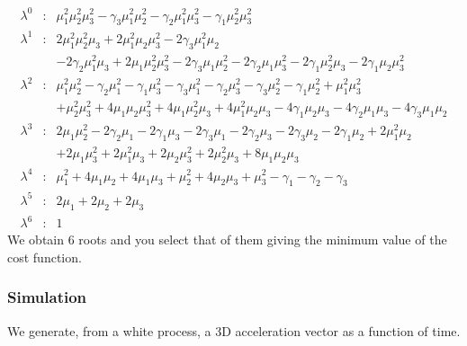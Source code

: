 \documentclass[a4paper, 12pt]{report}
\begin{document}
\begin{eqnarray*}
\lambda^{0}&:&
\mu_{1}^2\mu_{2}^2\mu_{3}^2 - \gamma_{3}\mu_{1}^2\mu_{2}^2 - \gamma_{2}\mu_{1}^2\mu_{3}^2 - \gamma_{1}\mu_{2}^2\mu_{3}^2
\\
\lambda^{1}&:&
2\mu_{1}^2\mu_{2}^2\mu_{3} + 2\mu_{1}^2\mu_{2}\mu_{3}^2 - 2\gamma_{3}\mu_{1}^2\mu_{2} \\
&&- 2\gamma_{2}\mu_{1}^2\mu_{3} + 2\mu_{1}\mu_{2}^2\mu_{3}^2 - 2\gamma_{3}\mu_{1}\mu_{2}^2 - 2\gamma_{2}\mu_{1}\mu_{3}^2 - 2\gamma_{1}\mu_{2}^2\mu_{3} - 2\gamma_{1}\mu_{2}\mu_{3}^2
\\
\lambda^{2}&:&
\mu_{1}^2\mu_{2}^2 - \gamma_{2}\mu_{1}^2 - \gamma_{1}\mu_{3}^2 - \gamma_{3}\mu_{1}^2 - \gamma_{2}\mu_{3}^2 - \gamma_{3}\mu_{2}^2 - \gamma_{1}\mu_{2}^2 + \mu_{1}^2\mu_{3}^2 \\
&&+ \mu_{2}^2\mu_{3}^2 + 4\mu_{1}\mu_{2}\mu_{3}^2 + 4\mu_{1}\mu_{2}^2\mu_{3} + 4\mu_{1}^2\mu_{2}\mu_{3} - 4\gamma_{1}\mu_{2}\mu_{3} - 4\gamma_{2}\mu_{1}\mu_{3} - 4\gamma_{3}\mu_{1}\mu_{2}
\\
\lambda^{3}&:&
2\mu_{1}\mu_{2}^2 - 2\gamma_{2}\mu_{1} - 2\gamma_{1}\mu_{3} - 2\gamma_{3}\mu_{1} - 2\gamma_{2}\mu_{3} - 2\gamma_{3}\mu_{2} - 2\gamma_{1}\mu_{2} + 2\mu_{1}^2\mu_{2} \\
&&+ 2\mu_{1}\mu_{3}^2 + 2\mu_{1}^2\mu_{3} + 2\mu_{2}\mu_{3}^2 + 2\mu_{2}^2\mu_{3} + 8\mu_{1}\mu_{2}\mu_{3}
\\
\lambda^{4}&:&
\mu_{1}^2 + 4\mu_{1}\mu_{2} + 4\mu_{1}\mu_{3} + \mu_{2}^2 + 4\mu_{2}\mu_{3} + \mu_{3}^2 - \gamma_{1} - \gamma_{2} - \gamma_{3}
\\
\lambda^{5}&:&2\mu_{1} + 2\mu_{2} + 2\mu_{3}
\\
\lambda^{6}&:&1
\end{eqnarray*}
We obtain 6 roots and you select that of them giving  the minimum value of the cost function.
 \subsubsection{Simulation}
 
We generate, from a white process, a 3D acceleration vector as a function of time. 
\end{document}
